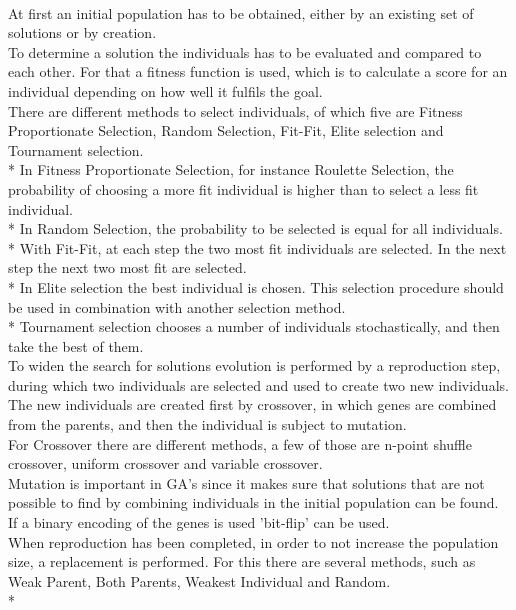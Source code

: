 \\At first an initial population has to be obtained, either by an existing set of solutions or by creation.\\
To determine a solution the individuals has to be evaluated and compared to each other. For that a fitness function is used, which is to calculate a score for an individual depending on how well it fulfils the goal.\\
There are different methods to select individuals, of which five are Fitness Proportionate Selection, Random Selection, Fit-Fit, Elite selection and Tournament selection.\\*
In Fitness Proportionate Selection, for instance Roulette Selection, the probability of choosing a more fit individual is higher than to select a less fit individual.\\*
In Random Selection, the probability to be selected is equal for all individuals. \\*
With Fit-Fit, at each step the two most fit individuals are selected. In the next step the next two most fit are selected.\\*
In Elite selection the best individual is chosen. This selection procedure should be used in combination with another selection method.\\*
Tournament selection chooses a number of individuals stochastically, and then take the best of them.\\
To widen the search for solutions evolution is performed by a reproduction step, during which two individuals are selected and used to create two new individuals. The new individuals are created first by crossover, in which genes are combined from the parents, and then the individual is subject to mutation.\\
For Crossover there are different methods, a few of those are n-point shuffle crossover, uniform crossover and variable crossover.\\
Mutation is important in GA's since it makes sure that solutions that are not possible to find by combining individuals in the initial population can be found. If a binary encoding of the genes is used 'bit-flip' can be used.\\
When reproduction has been completed, in order to not increase the population size, a replacement is performed. For this there are several methods, such as Weak Parent, Both Parents, Weakest Individual and Random.\\*
